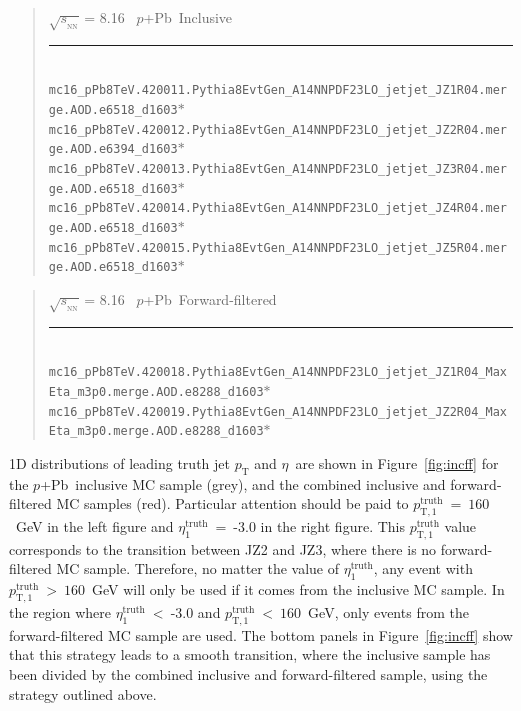 \documentclass[NOTE, atlasdraft=true, texlive=2020, UKenglish]{atlasdoc}
\newcommand{\PT}{$p_{\text{T}}$}
\newcommand{\ETA}{$\eta$}
\newcommand{\SNN}{\ensuremath{\sqrt{s_{_\text{NN}}}}}
\newcommand{\pxPb}{$p$+Pb}
\newcommand{\TN}[1]{ \text{#1} }
\begin{document}
\begin{quote}
\SNN\,= 8.16 \TeV\ \pxPb\ Inclusive\\
\noindent\rule{12cm}{0.4pt}\\
{\scriptsize
    \texttt{mc16\_pPb8TeV.420011.Pythia8EvtGen\_A14NNPDF23LO\_jetjet\_JZ1R04.merge.AOD.e6518\_d1603$*$}\\
    \texttt{mc16\_pPb8TeV.420012.Pythia8EvtGen\_A14NNPDF23LO\_jetjet\_JZ2R04.merge.AOD.e6394\_d1603$*$}\\
    \texttt{mc16\_pPb8TeV.420013.Pythia8EvtGen\_A14NNPDF23LO\_jetjet\_JZ3R04.merge.AOD.e6518\_d1603$*$}\\
    \texttt{mc16\_pPb8TeV.420014.Pythia8EvtGen\_A14NNPDF23LO\_jetjet\_JZ4R04.merge.AOD.e6518\_d1603$*$}\\
    \texttt{mc16\_pPb8TeV.420015.Pythia8EvtGen\_A14NNPDF23LO\_jetjet\_JZ5R04.merge.AOD.e6518\_d1603$*$}\\
}
\end{quote}
\begin{quote}
\SNN\,= 8.16 \TeV\ \pxPb\ Forward-filtered\\
\noindent\rule{12cm}{0.4pt}\\
{\scriptsize
    \texttt{mc16\_pPb8TeV.420018.Pythia8EvtGen\_A14NNPDF23LO\_jetjet\_JZ1R04\_MaxEta\_m3p0.merge.AOD.e8288\_d1603$*$}\\
    \texttt{mc16\_pPb8TeV.420019.Pythia8EvtGen\_A14NNPDF23LO\_jetjet\_JZ2R04\_MaxEta\_m3p0.merge.AOD.e8288\_d1603$*$}\\
}
\end{quote}


\clearpage

1D distributions of leading truth jet \PT{} and \ETA\ are shown in Figure~\ref{fig:incff} for the \pxPb\ inclusive MC sample (grey), and the combined inclusive and forward-filtered MC samples (red). Particular attention should be paid to $p_{\TN{T},1}^{\TN{truth}}~=~160$~GeV in the left figure and $\eta_{1}^{\TN{truth}}$~=~-3.0 in the right figure. This $p_{\TN{T},1}^{\TN{truth}}$ value corresponds to the transition between JZ2 and JZ3, where there is no forward-filtered MC sample. Therefore, no matter the value of $\eta_{1}^{\TN{truth}}$, any event with $p_{\TN{T},1}^{\TN{truth}}~>~160$~GeV will only be used if it comes from the inclusive MC sample. In the region where $\eta_{1}^{\TN{truth}}$~<~-3.0 and $p_{\TN{T},1}^{\TN{truth}}~<~160$~GeV, only events from the forward-filtered MC sample are used. The bottom panels in Figure~\ref{fig:incff} show that this strategy leads to a smooth transition, where the inclusive sample has been divided by the combined inclusive and forward-filtered sample, using the strategy outlined above. 
\end{document}
